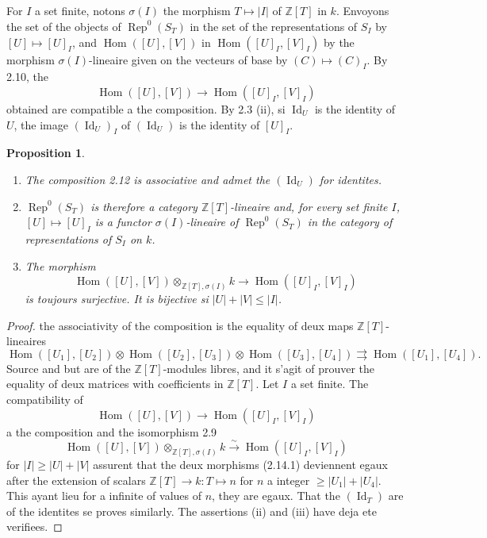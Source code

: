 \documentclass[11pt,a4paper]{article}
\theoremstyle{plain}
\newtheorem{proposition}[theorem]{Proposition}
\theoremstyle{definition}
\DeclareMathOperator{\Hom}{Hom}
\DeclareMathOperator{\Rep}{Rep}
\newcommand{\Z}{\mathbb{Z}}
\newcommand{\isom}{\xrightarrow{\sim}}
\DeclareMathOperator{\Id}{Id}
\begin{document}
\subsection{}
For $I$ a set finite, notons $\sigma(I)$ the morphism $T \mapsto |I|$ of $\Z[T]$ in $k$. Envoyons the set of the objects of $\Rep^0(S_T)$ in the set of the representations of $S_I$ by $[U] \mapsto [U]_I$, and $\Hom([U], [V])$ in $\Hom([U]_I, [V]_I)$ by the morphism $\sigma(I)$-lineaire given on the vecteurs of base by $(C) \mapsto (C)_I$. By 2.10, the
\[
\Hom([U], [V]) \to \Hom([U]_I, [V]_I)
\]
obtained are compatible a the composition. By 2.3 (ii), si $\Id_U$ is the identity of $U$, the image $(\Id_U)_I$ of $(\Id_U)$ is the identity of $[U]_I$.

\begin{proposition}
\begin{enumerate}[label=(\roman*)]
\item The composition 2.12 is associative and admet the $(\Id_U)$ for identites.
\item $\Rep^0(S_T)$ is therefore a category $\Z[T]$-lineaire and, for every set finite $I$, $[U] \mapsto [U]_I$ is a functor $\sigma(I)$-lineaire of $\Rep^0(S_T)$ in the category of representations of $S_I$ on $k$.
\item The morphism
\[
\Hom([U], [V]) \otimes_{\Z[T], \sigma(I)} k \to \Hom([U]_I, [V]_I)
\]
is toujours surjective. It is bijective si $|U| + |V| \leq |I|$.
\end{enumerate}
\end{proposition}

\begin{proof}
the associativity of the composition is the equality of deux maps $\Z[T]$-lineaires
\begin{equation}
\Hom([U_1], [U_2]) \otimes \Hom([U_2], [U_3]) \otimes \Hom([U_3], [U_4]) \rightrightarrows \Hom([U_1], [U_4]). \tag{2.14.1}
\end{equation}
Source and but are of the $\Z[T]$-modules libres, and it s'agit of prouver the equality of deux matrices with coefficients in $\Z[T]$. Let $I$ a set finite. The compatibility of
\[
\Hom([U], [V]) \to \Hom([U]_I, [V]_I)
\]
a the composition and the isomorphism 2.9
\[
\Hom([U], [V]) \otimes_{\Z[T], \sigma(I)} k \isom \Hom([U]_I, [V]_I)
\]
for $|I| \geq |U| + |V|$ assurent that the deux morphisms (2.14.1) deviennent egaux after the extension of scalars $\Z[T] \to k : T \mapsto n$ for $n$ a integer $\geq |U_1| + |U_4|$. This ayant lieu for a infinite of values of $n$, they are egaux. That the $(\Id_T)$ are of the identites se proves similarly. The assertions (ii) and (iii) have deja ete verifiees.
\end{proof}
\end{document}
